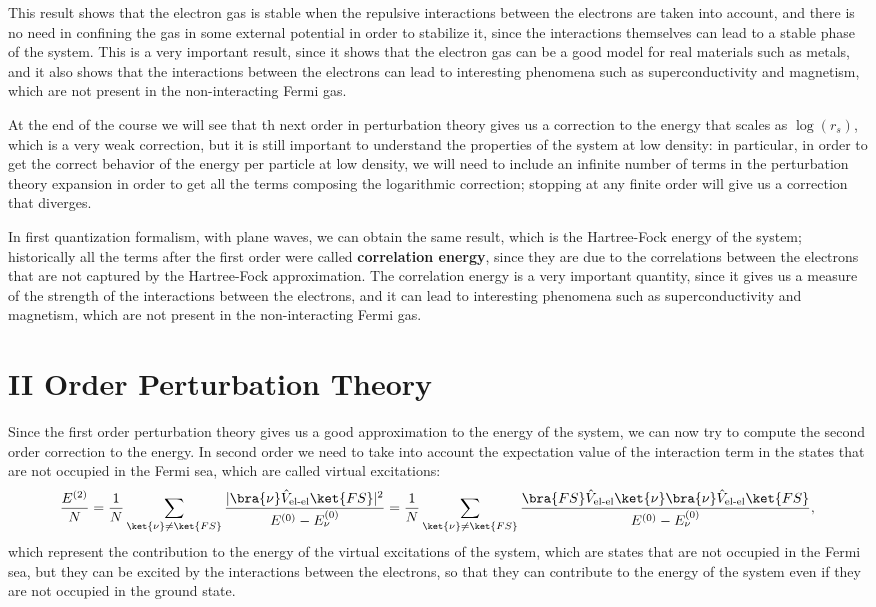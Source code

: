 This result shows that the electron gas is stable when the repulsive interactions between the electrons are taken into account, and there is no need in confining the gas in some external potential in order to stabilize it, since the interactions themselves can lead to a stable phase of the system. This is a very important result, since it shows that the electron gas can be a good model for real materials such as metals, and it also shows that the interactions between the electrons can lead to interesting phenomena such as superconductivity and magnetism, which are not present in the non-interacting Fermi gas.

At the end of the course we will see that th next order in perturbation theory gives us a correction to the energy that scales as \(\log(r_s)\), which is a very weak correction, but it is still important to understand the properties of the system at low density: in particular, in order to get the correct behavior of the energy per particle at low density, we will need to include an infinite number of terms in the perturbation theory expansion in order to get all the terms composing the logarithmic correction; stopping at any finite order will give us a correction that diverges.

In first quantization formalism, with plane waves, we can obtain the same result, which is the Hartree-Fock energy of the system; historically all the terms after the first order were called \textbf{correlation energy}, since they are due to the correlations between the electrons that are not captured by the Hartree-Fock approximation. The correlation energy is a very important quantity, since it gives us a measure of the strength of the interactions between the electrons, and it can lead to interesting phenomena such as superconductivity and magnetism, which are not present in the non-interacting Fermi gas.

\section{II Order Perturbation Theory}

Since the first order perturbation theory gives us a good approximation to the energy of the system, we can now try to compute the second order correction to the energy. In second order we need to take into account the expectation value of the interaction term in the states that are not occupied in the Fermi sea, which are called virtual excitations:
\[
    \frac{E^{(2)}}{N} = \frac{1}{N} \sum_{\ket{\nu}\neq \ket{FS}} \frac{|\bra{\nu} \hat{V}_{\text{el-el}} \ket{FS}|^2}{E^{(0)} - E_\nu^{(0)}} = \frac{1}{N} \sum_{\ket{\nu}\neq \ket{FS}} \frac{\bra{FS} \hat{V}_{\text{el-el}} \ket{\nu} \bra{\nu} \hat{V}_{\text{el-el}} \ket{FS}}{E^{(0)} - E_\nu^{(0)}},
\]
which represent the contribution to the energy of the virtual excitations of the system, which are states that are not occupied in the Fermi sea, but they can be excited by the interactions between the electrons, so that they can contribute to the energy of the system even if they are not occupied in the ground state.

